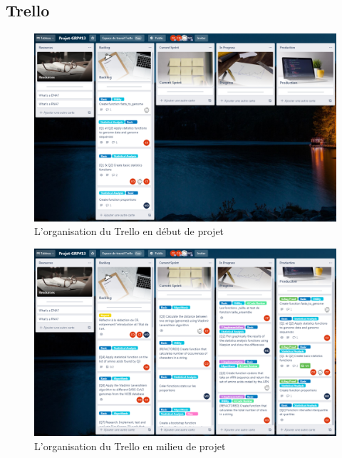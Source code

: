 \documentclass[12pt]{article}
\begin{document}
    \subsection*{Trello}
        \begin{figure}[!h]
            \centering
            \includegraphics[scale = 0.43]{Images/Gestion de Projet/Trello/trello_debut.PNG}
            \caption{L'organisation du Trello en début de projet}
            \label{fig:Trellodebut}
        \end{figure}
        \begin{figure}[!h]
            \centering
            \includegraphics[scale = 0.43]{Images/Gestion de Projet/Trello/trello_milieu.PNG}
            \caption{L'organisation du Trello en milieu de projet}
        \label{fig:Trellomilieu}
        \end{figure}
        \newpage
\end{document}
